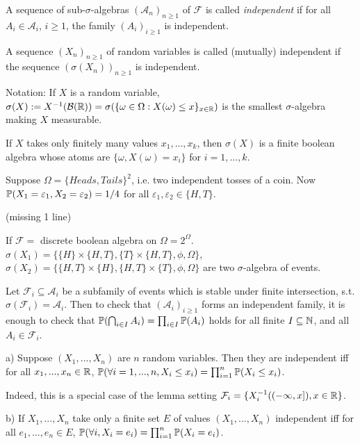 \documentclass[a4paper]{article}
\begin{document}
\begin{defi}
A sequence of sub-$\sigma$-algebras $(\mathcal{A}_n)_{n \geq 1}$ of $\mathcal{F}$ is called \emph{independent} if for all $A_i \in \mathcal{A}_i$, $i \geq 1$, the family $(A_i)_{i \geq 1}$ is independent.
\end{defi}

\begin{defi}
A sequence $(X_n)_{n \geq 1}$ of random variables is called (mutually) independent if the sequence $(\sigma(X_n))_{n \geq 1}$ is independent.
\end{defi}

Notation: If $X$ is a random variable, $\sigma(X):=X^{-1}(\mathcal{B}(\R)) = \sigma(\{\omega \in \Omega: X(\omega) \leq x\}_{x \in \R})$ is the smallest $\sigma$-algebra making $X$ measurable.

\begin{eg}
If $X$ takes only finitely many values $x_1,...,x_k$, then $\sigma(X)$ is a finite boolean algebra whose atoms are $\{\omega,X(\omega) = x_i\}$ for $i=1,...,k$.
\end{eg}

\begin{eg}
Suppose $\Omega = \{Heads, Tails\}^2$, i.e. two independent tosses of a coin. Now $\P(X_1 = \varepsilon_1,X_2 = \varepsilon_2) = 1/4$ for all $\varepsilon_1,\varepsilon_2 \in \{H,T\}$.

(missing 1 line)

If $\mathcal{F} = $ discrete boolean algebra on $\Omega = 2^\Omega$. $\sigma(X_1) = \{\{H\} \times \{H,T\},\{T\}\times\{H,T\},\phi,\Omega\}$, $\sigma(X_2) = \{\{H,T\} \times \{H\},\{H,T\}\times\{T\},\phi,\Omega\}$ are two $\sigma$-algebra of events.
\end{eg}

\begin{lemma}
Let $\mathcal{F}_i \subseteq \mathcal{A}_i$ be a subfamily of events which is stable under finite intersection, s.t. $\sigma(\mathcal{F}_i) = \mathcal{A}_i$. Then to check that $(\mathcal{A}_i)_{i \geq 1}$ forms an independent family, it is enough to check that $\P(\bigcap_{i \in I} A_i) = \prod_{i \in I} \P(A_i)$ holds for all finite $I \subseteq \N$, and all $A_i \in \mathcal{F}_i$.
\end{lemma}

\begin{eg}
a) Suppose $(X_1,...,X_n)$ are $n$ random variables. Then they are independent iff for all $x_1,...,x_n \in \R$, $\P(\forall i=1,...,n, X_i \leq x_i) = \prod_{i=1}^n \P(X_i \leq x_i)$.

Indeed, this is a special case of the lemma setting $\mathcal{F}_i = \{X_i^{-1} ((-\infty,x]),x \in \R\}$.

b) If $X_1,...,X_n$ take only a finite set $E$ of values $(X_1,...,X_n)$ independent iff for all $e_1,...,e_n \in E$, $\P(\forall i, X_i = e_i) = \prod_{i=1}^n \P(X_i = e_i)$.
\end{eg}
\end{document}

